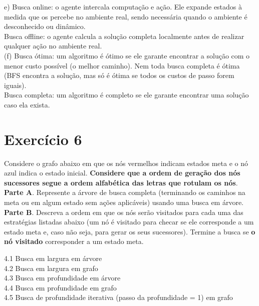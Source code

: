 \documentclass[a4paper,12pt]{article}
\begin{document}
e) Busca online: o agente intercala computação e ação. Ele expande estados à medida que os percebe no ambiente real, sendo necessária quando o ambiente é desconhecido ou dinâmico. \\

Busca offline: o agente calcula a solução completa localmente antes de realizar qualquer ação no ambiente real. \\

(f) Busca ótima: um algoritmo é ótimo se ele garante encontrar a solução com o menor custo possível (o melhor caminho). Nem toda busca completa é ótima (BFS encontra a solução, mas só é ótima se todos os custos de passo forem iguais).  \\ 

Busca completa: um algoritmo é completo se ele garante encontrar uma solução caso ela exista. \\


\newpage
\section*{Exercício 6}

Considere o grafo abaixo em que os nós vermelhos indicam estados meta e o nó azul indica o
estado inicial. \textbf{Considere que a ordem de geração dos nós sucessores segue a ordem alfabética
das letras que rotulam os nós}. \\

\textbf{Parte A}. Represente a árvore de busca completa (terminando os caminhos na meta ou em algum
estado sem ações aplicáveis) usando uma busca em árvore.\\

\textbf{Parte B}. Descreva a ordem em que os nós serão visitados para cada uma das estratégias listadas
abaixo (um nó é visitado para checar se ele corresponde a um estado meta e, caso não seja, para
gerar os seus sucessores). Termine a busca se \textbf{o nó visitado} corresponder a um estado meta.

4.1 Busca em largura em árvore\\
4.2 Busca em largura em grafo\\
4.3 Busca em profundidade em árvore\\
4.4 Busca em profundidade em grafo\\
4.5 Busca de profundidade iterativa (passo da profundidade = 1) em grafo\\
\end{document}
